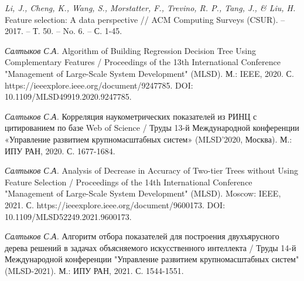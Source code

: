 \documentclass[12pt]{a&t}
\begin{document}
\begin{thebibliography}{10}
\bibitem{}
{\it Li, J., Cheng, K., Wang, S., Morstatter, F., Trevino, R. P., Tang, J., & Liu, H.}
Feature selection: A data perspective // ACM Computing Surveys (CSUR). – 2017. – Т. 50. – No. 6. – С. 1-45.

\bibitem{}
{\it Салтыков С.А.}
Algorithm of Building Regression Decision Tree Using Complementary Features / Proceedings of the 13th International Conference "Management of Large-Scale System Development" (MLSD). М.: IEEE, 2020. С. https://ieeexplore.ieee.org/document/9247785. DOI: 10.1109/MLSD49919.2020.9247785.

\bibitem{}
{\it Салтыков С.А.}
Корреляция наукометрических показателей из РИНЦ с цитированием по базе Web of Science / Труды 13-й Международной конференции «Управление развитием крупномасштабных систем» (MLSD'2020, Москва). М.: ИПУ РАН, 2020. С. 1677-1684.

\bibitem{}
{\it Салтыков С.А.}
Analysis of Decrease in Accuracy of Two-tier Trees without Using Feature Selection / Proceedings of the 14th International Conference "Management of Large-Scale System Development" (MLSD). Moscow: IEEE, 2021. С. https://ieeexplore.ieee.org/document/9600173. DOI: 10.1109/MLSD52249.2021.9600173.

\bibitem{}
{\it Салтыков С.А.}
Алгоритм отбора показателей для построения двухъярусного дерева решений в задачах объясняемого искусственного интеллекта / Труды 14-й Международной конференции "Управление развитием крупномасштабных
систем" (MLSD-2021). М.: ИПУ РАН, 2021. С. 1544-1551.

\end{thebibliography}

\end{document}
